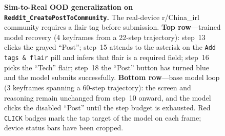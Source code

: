 \begin{figure}[t]
  \caption{\textbf{Sim-to-Real OOD generalization on \texttt{Reddit\_CreatePostToCommunity}.} The real-device r/China\_irl community requires a flair tag before submission. \textbf{Top row}---trained model recovery (4 keyframes from a 22-step trajectory): step~13 clicks the grayed ``Post''; step~15 attends to the asterisk on the \texttt{Add tags \& flair} pill and infers that flair is a required field; step~16 picks the ``Tech'' flair; step~18 the ``Post'' button has turned blue and the model submits successfully. \textbf{Bottom row}---base model loop (3 keyframes spanning a 60-step trajectory): the screen and reasoning remain unchanged from step~10 onward, and the model clicks the disabled ``Post'' until the step budget is exhausted. Red \texttt{CLICK} badges mark the tap target of the model on each frame; device status bars have been cropped.}
  \label{fig:reddit-case}
\end{figure}

